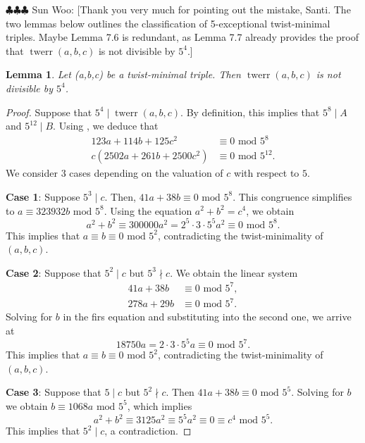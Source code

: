 \documentclass[12pt]{amsart}
\newcounter{counter}[section] %
\numberwithin{equation}{section} %
\newtheorem{lemma}[counter]{Lemma}
\theoremstyle{definition} \newtheorem{definition}[counter]{Definition}
\theoremstyle{remark} \newtheorem{nonexam}[counter]{Non-example}
\newcommand{\md}{\text{ mod }} %
\newcommand{\spark}[1]{{\color{olive} \sf
    $\clubsuit\clubsuit\clubsuit$ Sun Woo: [#1]}}
\DeclareMathOperator{\twerr}{twerr} %
\begin{document}
\spark{Thank you very much for pointing out the mistake, Santi. The two lemmas below outlines the classification of 5-exceptional twist-minimal triples. Maybe Lemma 7.6 is redundant, as Lemma 7.7 already provides the proof that $\twerr(a,b,c)$ is not divisible by $5^4$.}

\begin{lemma} \label{lemma:625-nmid-twerr}
    Let (a,b,c) be a twist-minimal triple. Then $\twerr(a,b,c)$ is not divisible by $5^4$.
\end{lemma}
\begin{proof}
    Suppose that $5^4 \mid \twerr(a,b,c)$. By definition, this implies that $5^8 \mid A$ and $5^{12} \mid B$. Using , we deduce that
    \begin{align*}
        123a + 114b + 125c^2 &\equiv 0 \text{ mod } 5^8 \\
        c(2502a + 261b + 2500c^2) &\equiv 0 \text{ mod } 5^{12}.
    \end{align*}
    We consider 3 cases depending on the valuation of $c$ with respect to $5$.

    \medskip \textbf{Case 1}: Suppose $5^3 \mid c$. Then,
    $41 a + 38b \equiv 0 \md 5^8$. This congruence simplifies to
    $a \equiv 323932b \md 5^8$. Using the equation $a^2 + b^2 = c^4$, we obtain
    \begin{equation*}
        a^2 + b^2 \equiv 300000a^2 = 2^5 \cdot 3 \cdot 5^5 a^2 \equiv 0 \md 5^8.
    \end{equation*}
    This implies that $a \equiv b \equiv 0 \text{ mod } 5^2$, contradicting
    the twist-minimality of $(a,b,c)$.

    \medskip 
    \textbf{Case 2}: Suppose that $5^2 \mid c$ but $5^3 \nmid c$. We obtain the
    linear system
    \begin{align*}
        41a + 38b &\equiv 0 \md 5^7, \\
        278a + 29b &\equiv 0 \md 5^7.
    \end{align*}
    Solving for $b$ in the firs equation and substituting into the second one,
    we arrive at
    \begin{equation*}
        18750a = 2 \cdot 3 \cdot 5^5 a \equiv 0 \md 5^7.
    \end{equation*}
    This implies that $a \equiv b \equiv 0 \md 5^2$, contradicting
    the twist-minimality of $(a,b,c)$.

    \medskip \textbf{Case 3}: Suppose that $5 \mid c$ but $5^2 \nmid c$. Then
    $41a + 38b \equiv 0 \md 5^5$. Solving for $b$ we obtain
    $b \equiv 1068a \md5^5$, which implies
    \begin{equation*}
        a^2 + b^2 \equiv 3125 a^2 \equiv 5^5 a^2 \equiv 0 \equiv c^4 \text{ mod } 5^5.
    \end{equation*}
    This implies that $5^2 \mid c$, a contradiction.


\end{proof}
\end{document}
